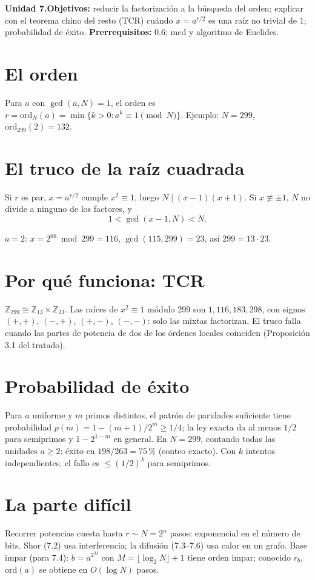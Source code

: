 \documentclass[11pt,a4paper]{article}
\begin{document}

\noindent\textbf{Unidad 7.}\quad\textbf{Objetivos:} reducir la factorización a la búsqueda del orden; explicar con el teorema chino del resto (TCR) cuándo
$x=a^{r/2}$ es una raíz no trivial de 1; probabilidad de éxito.
\textbf{Prerrequisitos:} 0.6; mcd y algoritmo de Euclides.

\section{El orden}
Para $a$ con $\gcd(a,N)=1$, el orden es $r=\mathrm{ord}_N(a)=\min\{k>0:a^k\equiv1\pmod N\}$. Ejemplo: $N=299$, $\mathrm{ord}_{299}(2)=132$.

\section{El truco de la raíz cuadrada}
Si $r$ es par, $x=a^{r/2}$ cumple $x^2\equiv1$, luego $N\mid(x-1)(x+1)$. Si $x\not\equiv\pm1$, $N$ no divide a ninguno de los factores, y
\[1<\gcd(x-1,N)<N.\]
\begin{ejemplo}
$a=2$: $x=2^{66}\bmod299=116$, $\gcd(115,299)=23$, así $299=13\cdot23$.
\end{ejemplo}

\section{Por qué funciona: TCR}
$\mathbb Z_{299}\cong\mathbb Z_{13}\times\mathbb Z_{23}$. Las raíces de $x^2\equiv1$ módulo 299 son $1,116,183,298$, con signos $(+,+)$, $(-,+)$, $(+,-)$, $(-,-)$:
solo las mixtas factorizan. El truco falla cuando las partes de potencia de dos de los órdenes locales coinciden (Proposición 3.1 del tratado).

\section{Probabilidad de éxito}
Para $a$ uniforme y $m$ primos distintos, el patrón de paridades suficiente tiene probabilidad $p(m)=1-(m+1)/2^m\ge1/4$; la ley exacta da al menos $1/2$
para semiprimos y $1-2^{1-m}$ en general. En $N=299$, contando todas las unidades $a\ge2$: éxito en $198/263=75\,\%$ (conteo exacto). Con $k$ intentos
independientes, el fallo es $\le(1/2)^k$ para semiprimos.

\section{La parte difícil}
Recorrer potencias cuesta hasta $r\sim N=2^n$ pasos: exponencial en el número de bits. Shor (7.2) usa interferencia; la difusión (7.3--7.6) usa calor en un grafo.
Base impar (para 7.4): $b=a^{2^M}$ con $M=\lfloor\log_2N\rfloor+1$ tiene orden impar; conocido $r_b$, $\mathrm{ord}(a)$ se obtiene en $O(\log N)$ pasos.
\end{document}
